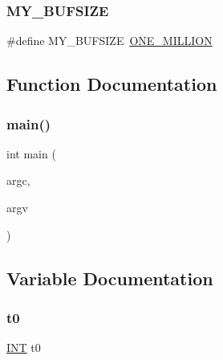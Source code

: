 \subsubsection{\texorpdfstring{M\+Y\+\_\+\+B\+U\+F\+S\+I\+ZE}{MY\_BUFSIZE}}
{\footnotesize\ttfamily \#define M\+Y\+\_\+\+B\+U\+F\+S\+I\+ZE~\mbox{\hyperlink{galois_8h_a6a146c1b2155b03eb2ffa3f4ba755034}{O\+N\+E\+\_\+\+M\+I\+L\+L\+I\+ON}}}



\subsection{Function Documentation}
\mbox{\label{process___p_g_8_c_a3c04138a5bfe5d72780bb7e82a18e627}} 
\subsubsection{\texorpdfstring{main()}{main()}}
{\footnotesize\ttfamily int main (\begin{DoxyParamCaption}\item[{int}]{argc,  }\item[{char $\ast$$\ast$}]{argv }\end{DoxyParamCaption})}



\subsection{Variable Documentation}
\mbox{\label{process___p_g_8_c_a4268f4fe222ffb119218a0199f5e1904}} 
\subsubsection{\texorpdfstring{t0}{t0}}
{\footnotesize\ttfamily \mbox{\hyperlink{galois_8h_a09fddde158a3a20bd2dcadb609de11dc}{I\+NT}} t0}


